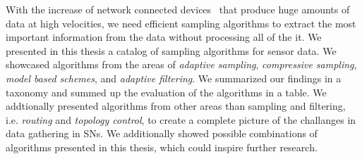 With the increase of network connected devices~\cite{gartner} that produce huge
amounts of data at high velocities, we need efficient sampling algorithms to
extract the most important information from the data without processing all of
the it. We presented in this thesis a catalog of sampling algorithms for sensor
data. We showcased algorithms from the areas of \textit{adaptive sampling},
\textit{compressive sampling}, \textit{model based schemes}, and
\textit{adaptive filtering}. We summarized our findings in a taxonomy and
summed up the evaluation of the algorithms in a table. We addtionally presented
algorithms from other areas than sampling and filtering, i.e. \textit{routing}
and \textit{topology control}, to create a complete picture of the challanges
in data gathering in \acp{SN}. We additionally showed possible combinations of
algorithms presented in this thesis, which could inspire further research.



